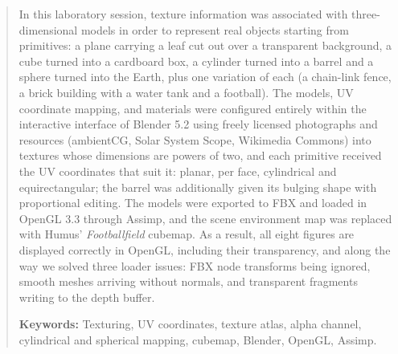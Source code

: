 \renewcommand{\abstractname}{Abstract}
\begin{abstract}
In this laboratory session, texture information was associated with three-dimensional models in order to represent real objects starting from primitives: a plane carrying a leaf cut out over a transparent background, a cube turned into a cardboard box, a cylinder turned into a barrel and a sphere turned into the Earth, plus one variation of each (a chain-link fence, a brick building with a water tank and a football). The models, UV coordinate mapping, and materials were configured entirely within the interactive interface of Blender 5.2 using freely licensed photographs and resources (ambientCG, Solar System Scope, Wikimedia Commons) into textures whose dimensions are powers of two, and each primitive received the UV coordinates that suit it: planar, per face, cylindrical and equirectangular; the barrel was additionally given its bulging shape with proportional editing. The models were exported to FBX and loaded in OpenGL 3.3 through Assimp, and the scene environment map was replaced with Humus' \textit{Footballfield} cubemap. As a result, all eight figures are displayed correctly in OpenGL, including their transparency, and along the way we solved three loader issues: FBX node transforms being ignored, smooth meshes arriving without normals, and transparent fragments writing to the depth buffer.

\vspace{0.3cm}
\noindent\textbf{Keywords:} Texturing, UV coordinates, texture atlas, alpha channel, cylindrical and spherical mapping, cubemap, Blender, OpenGL, Assimp.
\end{abstract}

